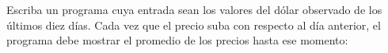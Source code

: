 \documentclass[11pt,spanish,a5paper,landscape]{article}
\begin{document}
  \thispagestyle{empty}

  Escriba un programa cuya entrada sean
  los valores del dólar observado de los últimos diez días.
  Cada vez que el precio suba con respecto al día anterior,
  el programa debe mostrar el promedio de los precios hasta ese momento:
  
\end{document}
